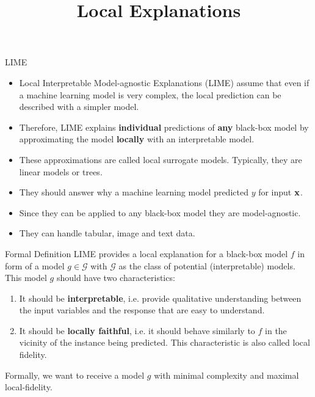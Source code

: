 \documentclass[11pt,compress,t,notes=noshow, xcolor=table]{beamer}
\title{Local Explanations}
\institute{\href{https://compstat-lmu.github.io/lecture_i2ml/}{compstat-lmu.github.io/lecture\_i2ml}}
\date{}
\newcommand{\Gspace}{\mathcal{G}}
\begin{document}
	
	
	
	
	
	
	
	
	

\begin{vbframe}{LIME}
\begin{itemize}
		\item Local Interpretable Model-agnostic Explanations (LIME) assume that even if a machine learning model is very complex, the local prediction can be described with a simpler model.
		\item  Therefore, LIME explains \textbf{individual} predictions of \textbf{any} black-box model by approximating the model \textbf{locally} with an interpretable model.
		\item These approximations are called local surrogate models. Typically, they are linear models or trees.
		\item They should answer why a machine learning model predicted $y$ for input $\xv$.
		\item Since they can be applied to any black-box model they are model-agnostic.  
		\item They can handle tabular, image and text data. 
\end{itemize}
\end{vbframe}

\begin{vbframe}{Formal Definition}
	LIME provides a local explanation for a black-box model $f$ in form of a model $g \in \Gspace$ with $\Gspace$ as the class of potential (interpretable) models. This model $g$ should have two characteristics:
	\begin{enumerate}
		\item It should be \textbf{interpretable}, i.e. provide qualitative understanding between the input variables and the response that are easy to understand.  
		\item It should be \textbf{locally faithful}, i.e. it should behave similarly to $f$ in the vicinity of the instance being predicted. This characteristic is also called local fidelity. 
	\end{enumerate}
	Formally, we want to receive a model $g$ with minimal complexity and maximal local-fidelity. 
\end{vbframe}
\end{document}
